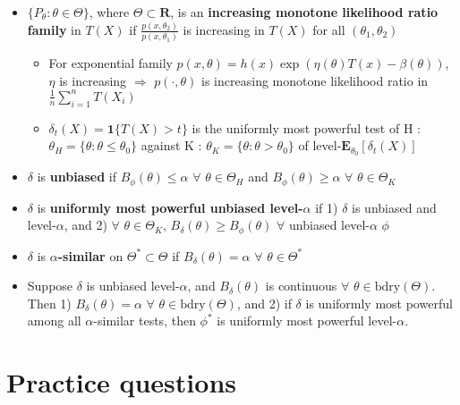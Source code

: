 \documentclass[12pt,english]{article}
\begin{document}
\begin{itemize}
\begin{itemize}
		\item $\{ P_{\theta} : \theta \in \Theta \}$, where $\Theta \subset \mathbf{R}$, is an \textbf{increasing monotone likelihood ratio family} in $T(X)$ if $\frac{p(x, \theta_{2})}{p(x, \theta_{1})}$ is increasing in $T(X)$ for all $(\theta_{1}, \theta_{2})$
		\begin{itemize}
			\item For exponential family $p(x, \theta) = h(x) \exp(\eta(\theta) T(x) - \beta(\theta))$, $\eta$ is increasing $\Rightarrow$ $p(\cdot, \theta)$ is increasing monotone likelihood ratio in $\frac{1}{n} \sum_{i=1}^{n} T(X_{i})$
			\item $\delta_{t}(X) = \mathbf{1}\{ T(X) > t \}$ is the uniformly most powerful test of H : $\theta_{H} = \{ \theta : \theta \leq \theta_{0} \}$ against K : $\theta_{K} = \{ \theta : \theta > \theta_{0} \}$ of level-$\mathbf{E}_{\theta_{0}}[\delta_{t}(X)]$
		\end{itemize}
		\item $\delta$ is \textbf{unbiased} if $B_{\phi}(\theta) \leq \alpha$ $\forall$ $\theta \in \Theta_{H}$ and $B_{\phi}(\theta) \geq \alpha$ $\forall$ $\theta \in \Theta_{K}$
		\item $\delta$ is \textbf{uniformly most powerful unbiased level-$\alpha$} if 1) $\delta$ is unbiased and level-$\alpha$, and 2) $\forall$ $\theta \in \Theta_{K}$, $B_{\delta}(\theta) \geq B_{\phi}(\theta)$ $\forall$ unbiased level-$\alpha$ $\phi$
		\item $\delta$ is \textbf{$\alpha$-similar} on $\Theta^{*} \subset \Theta$ if $B_{\delta}(\theta) = \alpha$ $\forall$ $\theta \in \Theta^{*}$
		\item Suppose $\delta$ is unbiased level-$\alpha$, and $B_{\delta}(\theta)$ is continuous $\forall$ $\theta \in \text{bdry}(\Theta)$. Then 1) $B_{\delta}(\theta) = \alpha$ $\forall$ $\theta \in \text{bdry}(\Theta)$, and 2) if $\delta$ is uniformly most powerful among all $\alpha$-similar tests, then $\phi^{*}$ is uniformly most powerful level-$\alpha$.
	\end{itemize}
\end{itemize}

\section{Practice questions}
\end{document}
